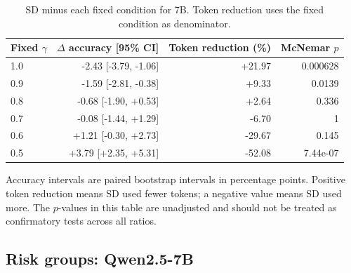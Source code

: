 \begin{table}[H]\centering\small

\caption{SD minus each fixed condition for 7B. Token reduction uses the fixed condition as denominator.}

\begin{tabular}{lrrr}

\toprule

Fixed $\gamma$ & $\Delta$ accuracy [95\% CI] & Token reduction (\%) & McNemar $p$\\

\midrule

1.0 & -2.43 [-3.79, -1.06] & +21.97 & 0.000628\\

0.9 & -1.59 [-2.81, -0.38] & +9.33 & 0.0139\\

0.8 & -0.68 [-1.90, +0.53] & +2.64 & 0.336\\

0.7 & -0.08 [-1.44, +1.29] & -6.70 & 1\\

0.6 & +1.21 [-0.30, +2.73] & -29.67 & 0.145\\

0.5 & +3.79 [+2.35, +5.31] & -52.08 & 7.44e-07\\

\bottomrule\end{tabular}\end{table}

Accuracy intervals are paired bootstrap intervals in percentage points. Positive token reduction means SD used fewer tokens; a negative value means SD used more. The $p$-values in this table are unadjusted and should not be treated as confirmatory tests across all ratios.

\subsection{Risk groups: Qwen2.5-7B}

